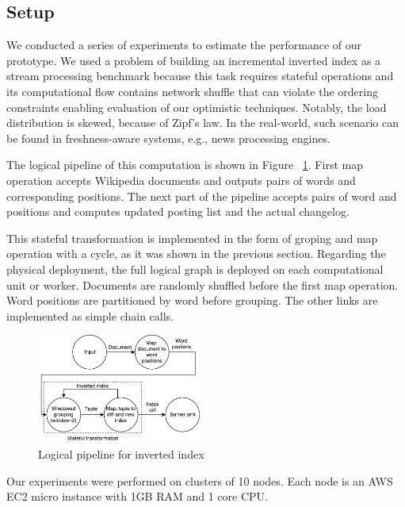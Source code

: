 
\label {fs-experiments}

\subsection{Setup}
We conducted a series of experiments to estimate the performance of our prototype. We used a problem of building an incremental inverted index as a stream processing benchmark because this task requires stateful operations and its computational flow contains network shuffle that can violate the ordering constraints enabling evaluation of our optimistic techniques. Notably, the load distribution is skewed, because of Zipf's law. In the real-world, such scenario can be found in freshness-aware systems, e.g., news processing engines.

The logical pipeline of this computation is shown in Figure ~\ref{inverted-index}. First map operation accepts Wikipedia documents and outputs pairs of words and corresponding positions. The next part of the pipeline accepts pairs of word and positions and computes updated posting list and the actual changelog. 

This stateful transformation is implemented in the form of groping and map operation with a cycle, as it was shown in the previous section. Regarding the physical deployment, the full logical graph is deployed on each computational unit or worker. Documents are randomly shuffled before the first map operation. Word positions are partitioned by word before grouping. The other links are implemented as simple chain calls.

\begin{figure}[htbp]
  \centering
  \includegraphics[width=0.48\textwidth]{pics/inverted-index}
  \caption{Logical pipeline for inverted index}
  \label {inverted-index}
\end{figure}

Our experiments were performed on clusters of 10 nodes. Each node is an AWS EC2 micro instance with 1GB RAM and 1 core CPU.


